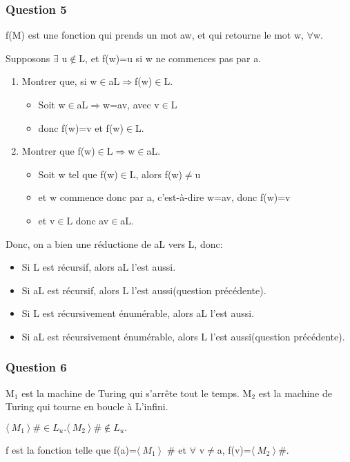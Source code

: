 \subsubsection{Question 5}

f(M) est une fonction qui prends un mot aw, et qui retourne le mot w, $\forall$w.

Supposons $\exists$ u$\not\in$L, et f(w)=u si w ne commences pas par a.
\begin{enumerate}
  \item Montrer que, si w$\in$aL$\Rightarrow$f(w)$\in$L.
  \begin{itemize}
    \item Soit w$\in$aL$\Rightarrow$w=av, avec v$\in$L
    \item donc f(w)=v et f(w)$\in$L.
  \end{itemize}
  \item Montrer que f(w)$\in$L$\Rightarrow$w$\in$aL.
  \begin{itemize}
    \item Soit w tel que f(w)$\in$L, alors f(w)$\neq$u
    \item et w commence donc par a, c'est-à-dire w=av, donc f(w)=v
    \item et v$\in$L donc av$\in$aL.
  \end{itemize}
\end{enumerate}

Donc, on a bien une réductione de aL vers L, donc:
\begin{itemize}
  \item Si L est récursif, alors aL l'est aussi.
  \item Si aL est récursif, alors L l'est aussi(question précédente).
  \item Si L est récursivement énumérable, alors aL l'est aussi.
  \item Si aL est récursivement énumérable, alors L l'est aussi(question précédente).
\end{itemize}

\subsubsection{Question 6}

M$_1$ est la machine de Turing qui s'arrête tout le temps.
M$_2$ est la machine de Turing qui tourne en boucle à L'infini.

$\langle\ M_1\ \rangle \!\ \# \in L_u. \langle\ M_2\ \rangle \!\ \# \not\in L_u.$

f est la fonction telle que f(a)=$\langle\ M_1\ \rangle \!\ $ \# et $\forall$ v$\neq$a, f(v)=$\langle\ M_2\ \rangle \!\ \# $.

